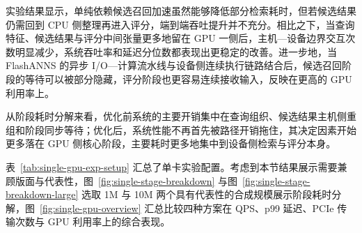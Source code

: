 实验结果显示，单纯依赖候选召回加速虽然能够降低部分检索耗时，但若候选结果仍需回到 CPU 侧整理再进入评分，端到端吞吐提升并不充分。相比之下，当查询特征、候选结果与评分中间张量更多地留在 GPU 一侧后，主机---设备边界交互次数明显减少，系统吞吐率和延迟分位数都表现出更稳定的改善。进一步地，当 FlashANNS 的异步 I/O---计算流水线与设备侧连续执行链路结合后，候选召回阶段的等待可以被部分隐藏，评分阶段也更容易连续接收输入，反映在更高的 GPU 利用率上。

从阶段耗时分解来看，优化前系统的主要开销集中在查询组织、候选结果主机侧重组和阶段同步等待；优化后，系统性能不再首先被路径开销拖住，其决定因素开始更多落在 GPU 侧核心阶段，主要耗时更多地集中到设备侧检索与评分本身。

表~\ref{tab:single-gpu-exp-setup} 汇总了单卡实验配置。考虑到本节结果展示需要兼顾版面与代表性，图~\ref{fig:single-stage-breakdown} 与图~\ref{fig:single-stage-breakdown-large} 选取 1M 与 10M 两个具有代表性的合成规模展示阶段耗时分解，图~\ref{fig:single-gpu-overview} 汇总比较四种方案在 QPS、p99 延迟、PCIe 传输次数与 GPU 利用率上的综合表现。

